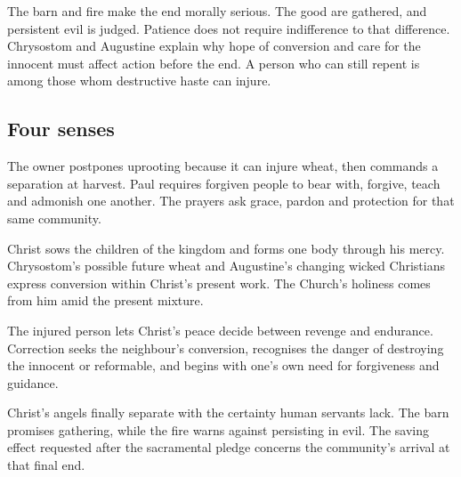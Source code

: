 The barn and fire make the end morally serious. The good are gathered,
and persistent evil is judged. Patience does not require indifference
to that difference. Chrysostom and Augustine explain why hope of
conversion and care for the innocent must affect action before the end.
A person who can still repent is among those whom destructive haste
can injure.

\subsection{Four senses}
\begin{fourSenses}
\item[Literal.] The owner postpones uprooting because it can injure wheat,
then commands a separation at harvest. Paul requires forgiven people to
bear with, forgive, teach and admonish one another. The prayers ask grace,
pardon and protection for that same community.
\item[Allegorical.] Christ sows the children of the kingdom and forms one
body through his mercy. Chrysostom's possible future wheat and Augustine's
changing wicked Christians express conversion within Christ's present
work. The Church's holiness comes from him amid the present mixture.
\item[Moral.] The injured person lets Christ's peace decide between revenge
and endurance. Correction seeks the neighbour's conversion, recognises
the danger of destroying the innocent or reformable, and begins with
one's own need for forgiveness and guidance.
\item[Anagogical.] Christ's angels finally separate with the certainty
human servants lack. The barn promises gathering, while the fire warns
against persisting in evil. The saving effect requested after the
sacramental pledge concerns the community's arrival at that final end.
\end{fourSenses}
